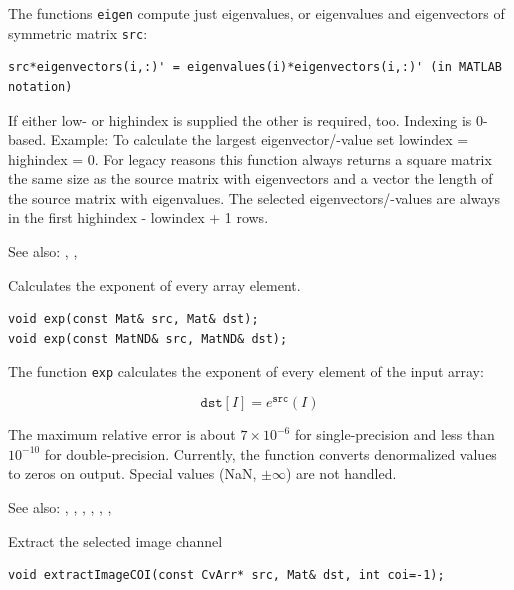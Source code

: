 The functions \texttt{eigen} compute just eigenvalues, or eigenvalues and eigenvectors of symmetric matrix \texttt{src}:

\begin{lstlisting}
src*eigenvectors(i,:)' = eigenvalues(i)*eigenvectors(i,:)' (in MATLAB notation)
\end{lstlisting}

If either low- or highindex is supplied the other is required, too.
Indexing is 0-based. Example: To calculate the largest eigenvector/-value set
lowindex = highindex = 0.
For legacy reasons this function always returns a square matrix the same size
as the source matrix with eigenvectors and a vector the length of the source
matrix with eigenvalues. The selected eigenvectors/-values are always in the
first highindex - lowindex + 1 rows.

See also: , , 

\label{exp}
Calculates the exponent of every array element.

\begin{lstlisting}
void exp(const Mat& src, Mat& dst);
void exp(const MatND& src, MatND& dst);
\end{lstlisting}
\begin{description}
\end{description}

The function \texttt{exp} calculates the exponent of every element of the input array:

\[
\texttt{dst} [I] = e^{\texttt{src}}(I)
\]

The maximum relative error is about $7 \times 10^{-6}$ for single-precision and less than $10^{-10}$ for double-precision. Currently, the function converts denormalized values to zeros on output. Special values (NaN, $\pm \infty$) are not handled.

See also: , , , , , , 

\label{extractImageCOI}

Extract the selected image channel

\begin{lstlisting}
void extractImageCOI(const CvArr* src, Mat& dst, int coi=-1);
\end{lstlisting}
\begin{description}
\end{description}

